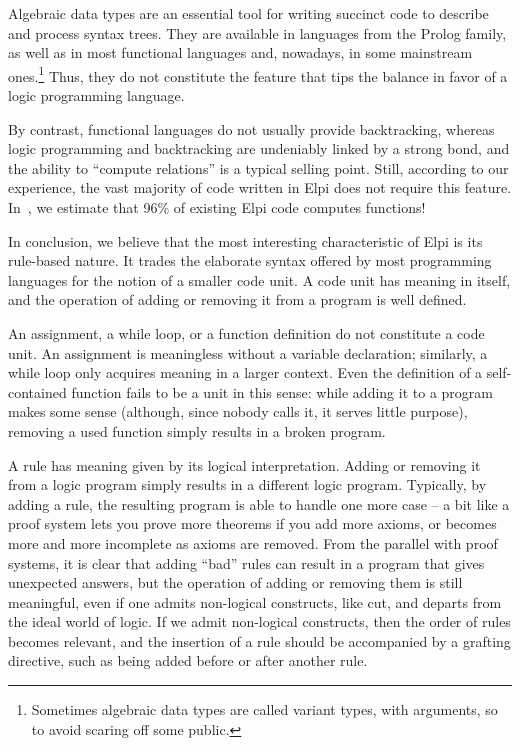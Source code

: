 \documentclass{these-ISSS}
\begin{document}
Algebraic data types are an essential tool for writing succinct code to
describe and process syntax trees. They are available in languages from the
Prolog family, as well as in most functional languages and, nowadays,
in some mainstream ones.\footnote{Sometimes algebraic data types are
called variant types, with arguments, so to avoid scaring off some public.}
Thus, they do not
constitute the feature that tips the balance in favor of a logic programming
language.

By contrast, functional languages do not usually provide backtracking, whereas
logic programming and backtracking are undeniably linked by a strong bond, and
the ability to ``compute relations'' is a typical selling point. Still,
according to our experience, the vast majority of code written in Elpi does
not require this feature. In~\cite{elpidet}, we estimate that 96\% of existing
Elpi code computes functions!

In conclusion, we believe that the most interesting characteristic of Elpi is
its rule-based nature. It trades the elaborate syntax offered by most
programming languages for the notion of a smaller code unit. A code unit has
meaning in itself, and the operation of adding or removing it from a program
is well defined.

An assignment, a while loop, or a function definition do not constitute a
code unit. An assignment is meaningless without a variable declaration;
similarly, a while loop only acquires meaning in a larger
context. Even the definition of a self-contained function fails to be a unit
in this sense: while adding it to a program makes some sense (although, since
nobody calls it, it serves little purpose), removing a used function simply
results in a broken program.

A rule has meaning given by its logical interpretation. Adding or removing it
from a logic program simply results in a different logic program. Typically,
by adding a rule, the resulting program is able to handle one more case -- a bit
like a proof system lets you prove more theorems if you add more axioms, or
becomes more and more incomplete as axioms are removed. From the parallel
with proof systems, it is clear that adding ``bad'' rules can result in a
program that gives unexpected answers, but the operation of adding or removing
them is still meaningful, even if one admits non-logical constructs, like
cut, and
departs from the ideal world of logic. If we admit non-logical constructs,
then the order of rules becomes relevant, and the insertion of a rule should
be accompanied by a grafting directive, such as being added before or after
another rule.
~\\
\end{document}
